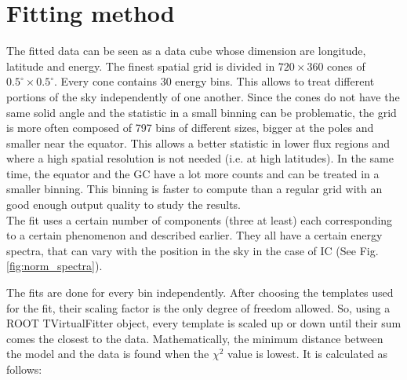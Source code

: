 
\newpage
\section{Fitting method}


The fitted data can be seen as a data cube whose dimension are longitude, latitude and energy. The finest spatial grid is divided in $720 \times 360$ cones of $ 0.5^\circ \times 0.5^\circ $. Every cone contains 30 energy bins. This allows to treat different portions of the sky independently of one another. Since the cones do not have the same solid angle and the statistic in a small binning can be problematic, the grid is more often composed of 797 bins of different sizes, bigger at the poles and smaller near the equator. This allows a better statistic in lower flux regions and where a high spatial resolution is not needed (i.e. at high latitudes). In the same time, the equator and the GC have a lot more counts and can be treated in a smaller binning. This binning is faster to compute than a regular grid with an good enough output quality to study the results.\\

The fit uses a certain number of components (three at least) each corresponding to a certain phenomenon and described earlier. They all have a certain energy spectra, that can vary with the position in the sky in the case of IC (See Fig. \ref{fig:norm_spectra}).

The fits are done for every bin independently. After choosing the templates used for the fit, their scaling factor is the only degree of freedom allowed.  So, using a ROOT TVirtualFitter object, every template is scaled up or down until their sum comes the closest to the data.
Mathematically, the minimum distance between the model and the data is found when the $\chi^2$ value is lowest. It is calculated as follows:

